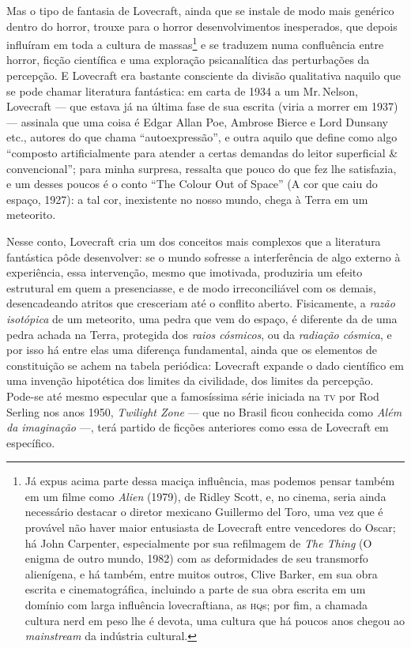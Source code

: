 Mas o tipo de fantasia de Lovecraft, ainda que se instale de modo mais
genérico dentro do horror, trouxe para o horror desenvolvimentos
inesperados, que depois influíram em toda a cultura de massas\footnote{Já
  expus acima parte dessa maciça influência, mas podemos pensar também
  em um filme como \emph{Alien} (1979), de Ridley Scott, e, no cinema,
  seria ainda necessário destacar o diretor mexicano Guillermo del Toro, uma vez que é provável não haver maior entusiasta de Lovecraft
  entre vencedores do Oscar; há John Carpenter, especialmente por
  sua refilmagem de \emph{The Thing} (O enigma de outro mundo, 1982) com as deformidades de seu
  transmorfo alienígena, e há também, entre muitos outros, Clive Barker, em sua obra escrita e cinematográfica, incluindo a parte de
  sua obra escrita em um domínio com larga influência lovecraftiana, as
  \textsc{hq}s; por fim, a chamada cultura nerd em peso lhe é devota, uma
  cultura que há poucos anos chegou ao \emph{mainstream} da indústria
  cultural.} e se traduzem numa confluência entre horror, ficção
científica e uma exploração psicanalítica das perturbações da percepção.
E Lovecraft era bastante consciente da divisão qualitativa naquilo que
se pode chamar literatura fantástica: em carta de 1934 a um Mr.\,Nelson, Lovecraft --- que estava já na última fase de sua escrita (viria
a morrer em 1937) --- assinala que uma coisa é Edgar Allan Poe, Ambrose
Bierce e Lord Dunsany etc., autores do que
chama ``autoexpressão'', e outra aquilo que define como algo ``composto
artificialmente para atender a certas demandas do leitor superficial \&
convencional''; para minha surpresa, ressalta que pouco do que fez lhe
satisfazia, e um desses poucos é o conto ``The Colour Out of Space'' (A
cor que caiu do espaço, 1927): a tal cor, inexistente no nosso mundo,
chega à Terra em um meteorito.

Nesse conto, Lovecraft cria um dos conceitos mais complexos que a
literatura fantástica pôde desenvolver: se o mundo sofresse a
interferência de algo externo à experiência, essa intervenção, mesmo que
imotivada, produziria um efeito estrutural em quem a presenciasse, e de
modo irreconciliável com os demais, desencadeando atritos que cresceriam
até o conflito aberto. Fisicamente, a \emph{razão isotópica} de um
meteorito, uma pedra que vem do espaço, é diferente da de uma pedra
achada na Terra, protegida dos \emph{raios cósmicos}, ou da
\emph{radiação cósmica}, e por isso há entre elas uma diferença
fundamental, ainda que os elementos de constituição se achem na tabela
periódica: Lovecraft expande o dado científico em uma invenção
hipotética dos limites da civilidade, dos limites da percepção. Pode-se
até mesmo especular que a famosíssima série iniciada na \textsc{tv} por Rod
Serling nos anos 1950, \emph{Twilight Zone} --- que no Brasil ficou
conhecida como \emph{Além da imaginação} ---, terá partido de
ficções anteriores como essa de Lovecraft em específico.


